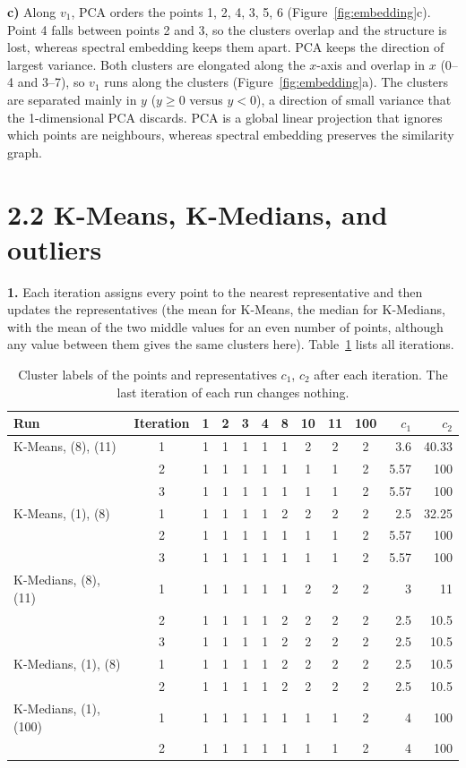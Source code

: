 \documentclass[a4paper,12pt]{article}
\begin{document}
\textbf{c)} Along $v_1$, PCA orders the points 1, 2, 4, 3, 5, 6
(Figure~\ref{fig:embedding}c). Point 4 falls between points 2 and 3, so the
clusters overlap and the structure is lost, whereas spectral embedding
keeps them apart. PCA keeps the direction of largest variance. Both
clusters are elongated along the $x$-axis and overlap in $x$ (0--4 and
3--7), so $v_1$ runs along the clusters (Figure~\ref{fig:embedding}a). The
clusters are separated mainly in $y$ ($y\ge0$ versus $y<0$), a direction of
small variance that the 1-dimensional PCA discards. PCA is a global linear
projection that ignores which points are neighbours, whereas spectral
embedding preserves the similarity graph.

\section*{2.2 K-Means, K-Medians, and outliers}

\textbf{1.} Each iteration assigns every point to the nearest
representative and then updates the representatives (the mean for K-Means,
the median for K-Medians, with the mean of the two middle values for an
even number of points, although any value between them gives the same
clusters here). Table~\ref{tab:runs} lists all iterations.

\begin{table}[!ht]
\centering
\caption{Cluster labels of the points and representatives $c_1$, $c_2$
  after each iteration. The last iteration of each run changes nothing.}
\label{tab:runs}
\begin{tabular}{lcccccccccrr}
\toprule
Run & Iteration & 1 & 2 & 3 & 4 & 8 & 10 & 11 & 100 & $c_1$ & $c_2$ \\
\midrule
K-Means, (8), (11) & 1 & 1 & 1 & 1 & 1 & 1 & 2 & 2 & 2 & 3.6 & 40.33 \\
 & 2 & 1 & 1 & 1 & 1 & 1 & 1 & 1 & 2 & 5.57 & 100 \\
 & 3 & 1 & 1 & 1 & 1 & 1 & 1 & 1 & 2 & 5.57 & 100 \\
\midrule
K-Means, (1), (8) & 1 & 1 & 1 & 1 & 1 & 2 & 2 & 2 & 2 & 2.5 & 32.25 \\
 & 2 & 1 & 1 & 1 & 1 & 1 & 1 & 1 & 2 & 5.57 & 100 \\
 & 3 & 1 & 1 & 1 & 1 & 1 & 1 & 1 & 2 & 5.57 & 100 \\
\midrule
K-Medians, (8), (11) & 1 & 1 & 1 & 1 & 1 & 1 & 2 & 2 & 2 & 3 & 11 \\
 & 2 & 1 & 1 & 1 & 1 & 2 & 2 & 2 & 2 & 2.5 & 10.5 \\
 & 3 & 1 & 1 & 1 & 1 & 2 & 2 & 2 & 2 & 2.5 & 10.5 \\
\midrule
K-Medians, (1), (8) & 1 & 1 & 1 & 1 & 1 & 2 & 2 & 2 & 2 & 2.5 & 10.5 \\
 & 2 & 1 & 1 & 1 & 1 & 2 & 2 & 2 & 2 & 2.5 & 10.5 \\
\midrule
K-Medians, (1), (100) & 1 & 1 & 1 & 1 & 1 & 1 & 1 & 1 & 2 & 4 & 100 \\
 & 2 & 1 & 1 & 1 & 1 & 1 & 1 & 1 & 2 & 4 & 100 \\
\bottomrule
\end{tabular}
\end{table}
\end{document}
